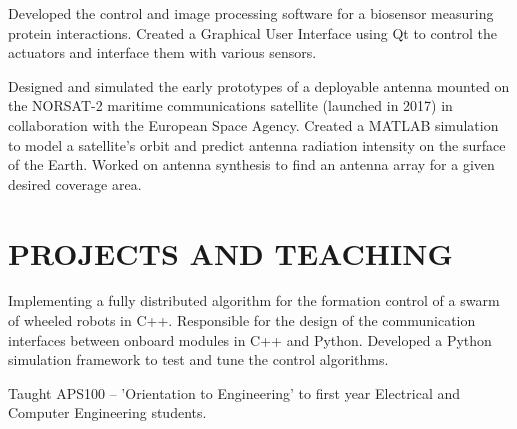 \documentclass{ResumeTemplate}
\begin{document}
	
	\workitemstwo
	{Developed the control and image processing software for a biosensor measuring protein interactions.}
	{Created a Graphical User Interface using Qt to control the actuators and interface them with various sensors.}
	

	\workitemstwo
	{Designed and simulated the early prototypes of a deployable antenna mounted on the NORSAT-2 maritime communications satellite (launched in 2017) in collaboration with the European Space Agency.}
	{Created a MATLAB simulation to model a satellite's orbit and predict antenna radiation intensity on the surface of the Earth. Worked on antenna synthesis to find an antenna array for a given desired coverage area.}
	
	\section{PROJECTS AND TEACHING}
	

	\workitemsthree
	{Implementing a fully distributed algorithm for the formation control of a swarm of wheeled robots in C++.}
	{Responsible for the design of the communication interfaces between onboard modules in C++ and Python.}
	{Developed a Python simulation framework to test and tune the control algorithms. }
	

	\workitemsone
	{Taught APS100 -- 'Orientation to Engineering' to first year Electrical and Computer Engineering students.}
	
\end{document}
